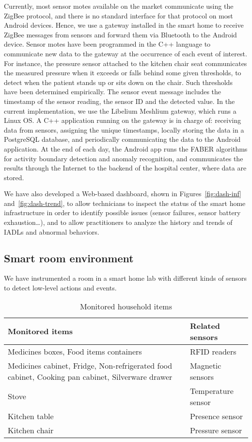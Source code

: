 \documentclass[10pt, conference, compsocconf]{IEEEtran}
\begin{document}
Currently, most sensor motes available on the market communicate using the 
ZigBee protocol, and there is no standard interface for that protocol on
most Android devices. Hence, we use a gateway installed in the
smart home to receive ZigBee messages from sensors and forward them via 
Bluetooth to the Android device.
Sensor motes have been programmed in the C++ language to communicate new
data to the gateway at the occurrence of each event of interest. For instance, the pressure
sensor attached to the kitchen chair seat communicates the measured pressure 
when it exceeds or falls behind some given thresholds, to detect when the patient 
stands up or sits down on the chair. Such thresholds have been determined 
empirically. 
The sensor event message includes the timestamp of the sensor reading, the
sensor ID and the detected value.
In the current implementation, we use the Libelium Meshlium gateway, 
which runs a Linux OS. A C++ application running on
the gateway is in charge of: receiving data from sensors, assigning the
unique timestamps, locally storing the data 
in a PostgreSQL database, and periodically communicating the data to the 
Android application. At the end of each day, the Android app runs the FABER 
algorithms for activity boundary detection and anomaly recognition, and 
communicates the results through the Internet to the backend of the hospital 
center, where data are stored.

We have also developed a Web-based dashboard,
shown in Figures~\ref{fig:dash-inf} and~\ref{fig:dash-trend}, 
to allow technicians to inspect the
status of the smart home infrastructure in order to identify possible issues 
(sensor failures, sensor battery exhaustion\ldots), and to allow practitioners
to analyze the history and trends of IADLs and abnormal behaviors.



\subsection{Smart room environment}
We have instrumented a room in a smart home lab with different
kinds of sensors to detect low-level actions and events.

\begin{table}[!ht] 
\caption{Monitored household items}
\label{table:sensors}
\centering
\begin{tabularx}{.9\columnwidth}{|X|l|}
\hline
\textbf{Monitored items} & \textbf{Related sensors} \\
\hline\hline
Medicines boxes, Food items containers & {RFID readers} \\
\hline
Medicines cabinet, Fridge, Non-refrigerated food cabinet, Cooking pan cabinet, Silverware drawer & {Magnetic sensors} \\
\hline
Stove & Temperature sensor \\
\hline 
Kitchen table & {Presence sensor} \\
\hline
Kitchen chair & Pressure sensor \\ 
\hline 
\end{tabularx} 
\end{table}
\end{document}
